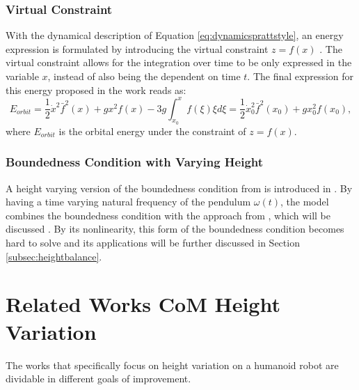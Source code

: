 \subsubsection{Virtual Constraint}
With the dynamical description of Equation \eqref{eq:dynamicsprattstyle}, an energy expression is formulated by introducing the virtual constraint $z=f(x)$ \cite{pratt2007derivation}. The virtual constraint allows for the integration over time to be only expressed in the variable $x$, instead of also being the dependent on time $t$. The final expression for this energy proposed in the work reads as:
\begin{equation}\label{eq:eorbit}
    E_{orbit}  = \frac{1}{2}\dot{x}^2\bar{f}^2(x)+gx^2f(x) - 3g\int_{x_0}^xf(\xi)\xi d\xi = \frac{1}{2}\dot{x}_0^2\bar{f}^2(x_0)+gx_0^2f(x_0),
\end{equation}
where $E_{orbit}$ is the orbital energy under the constraint of $z=f(x)$.

\subsubsection{Boundedness Condition with Varying Height}
A height varying version of the boundedness condition from \cite{lanari2014boundedness} is introduced in \cite{caron2018balance} . By having a time varying natural frequency of the pendulum $\omega(t)$, the model combines the boundedness condition with the approach from \cite{hopkins2014humanoid}, which will be discussed . By its nonlinearity, this form of the boundedness condition becomes hard to solve and its applications will be further discussed in Section \ref{subsec:heightbalance}.



\section{Related Works CoM Height Variation}\label{sec:relatedworksheight}
The works that specifically focus on height variation on a humanoid robot are dividable in different goals of improvement. 
